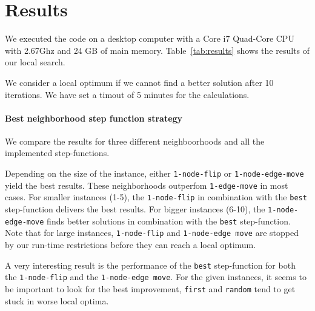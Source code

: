 \documentclass{scrartcl}
\begin{document}


\section{Results}

We executed the code on a desktop computer with a Core i7 Quad-Core
CPU with 2.67Ghz and 24 GB of main memory. Table~\ref{tab:results}
shows the results of our local search. 

We consider a local optimum if we cannot find a better solution after 10 iterations.
We have set a timout of 5 minutes for the calculations.

\paragraph{Best neighborhood step function strategy}

We compare the results for three different neighboorhoods and all the
implemented step-functions.

Depending on the size of the instance, either \texttt{1-node-flip} or
\texttt{1-node-edge-move} yield the best results. These neighborhoods
outperfom \texttt{1-edge-move} in most cases. For smaller instances (1-5), the
\texttt{1-node-flip} in combination with the \texttt{best} step-function delivers
the best results.  
For bigger instances (6-10), the
\texttt{1-node-edge-move} finds better solutions in combination with the
\texttt{best} step-function. 
Note that for large instances,
\texttt{1-node-flip} and \texttt{1-node-edge move} are stopped by
our run-time restrictions before they can reach a local optimum. 

A very interesting result is the performance of the \texttt{best}
step-function for both the \texttt{1-node-flip} and the
\texttt{1-node-edge move}. For the given instances, it seems to be
important to look for the best improvement, 
\texttt{first} and \texttt{random} tend to get stuck in worse local
optima.

\end{document}
